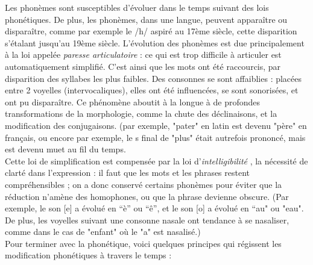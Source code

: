\documentclass[12pt, french, twoside]{report}
\begin{document}
Les phonèmes sont susceptibles d'évoluer dans le temps suivant des \og lois phonétiques\fg. De plus, les phonèmes, dans une langue, peuvent apparaître ou disparaître, comme par exemple le /h/ aspiré au 17ème siècle, cette disparition s'étalant jusqu'au 19ème siècle.  L'évolution des phonèmes est due principalement à la loi appelée \og \textit{paresse articulatoire} \fg{} : ce qui est trop difficile à articuler est automatiquement simplifié. C'est ainsi que les mots ont été raccourcis, par disparition des syllabes les plus faibles. Des consonnes se sont affaiblies : placées entre 2 voyelles (intervocaliques), elles ont été influencées, se sont sonorisées, et ont pu disparaître. Ce phénomène aboutit à la longue à de profondes transformations de la morphologie, comme la chute des déclinaisons, et la modification des conjugaisons. (par exemple, "pater" en latin est devenu "père" en français, ou encore par exemple, le \og s\fg{} final de "plus" était autrefois prononcé, mais est devenu muet au fil du temps.\\
\indent Cette loi de simplification est compensée par la loi d'\og \textit{intelligibilité} \fg, la nécessité de clarté dans l'expression : il faut que les mots et les phrases restent compréhensibles ; on a donc conservé certains phonèmes pour éviter que la réduction n'amène des homophones, ou que la phrase devienne obscure. (Par exemple, le son [e] a évolué en “è” ou “ê”, et le son [o] a évolué en “au" ou "eau". De plus, les voyelles suivant une consonne nasale ont tendance à se nasaliser, comme dans le cas de "enfant" où le "a" est nasalisé.)\\ 
Pour terminer avec la phonétique, voici quelques principes qui régissent les modification phonétiques à travers le temps : 
\end{document}
